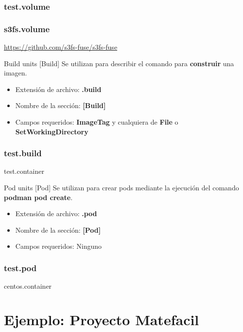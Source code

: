 \begin{frame}[fragile]
  \frametitle{test.volume}
  
\end{frame}

\begin{frame}[fragile]
  \frametitle{s3fs.volume}
  
  \href{https://github.com/s3fs-fuse/s3fs-fuse}
       {https://github.com/s3fs-fuse/s3fs-fuse}
\end{frame}

\begin{frame}[c]{Build units [Build]}
  Se utilizan para describir el comando para \textbf{construir}
  una imagen.
  \begin{itemize}
    \item Extensión de archivo: \textbf{.build}
    \item Nombre de la sección: \textbf{[Build]}
    \item Campos requeridos: \textbf{ImageTag} y cualquiera de
      \textbf{File} o \textbf{SetWorkingDirectory}
  \end{itemize}
\end{frame}

\begin{frame}[fragile]
  \frametitle{test.build}
  
  test.container
  
\end{frame}

\begin{frame}[c]{Pod units [Pod]}
  Se utilizan para crear pods mediante la ejecución del
  comando \textbf{podman pod create}.
  \begin{itemize}
    \item Extensión de archivo: \textbf{.pod}
    \item Nombre de la sección: \textbf{[Pod]}
    \item Campos requeridos: Ninguno
  \end{itemize}
\end{frame}

\begin{frame}[fragile]
  \frametitle{test.pod}
  
  centos.container
  
\end{frame}

\section{Ejemplo: Proyecto Matefacil}

